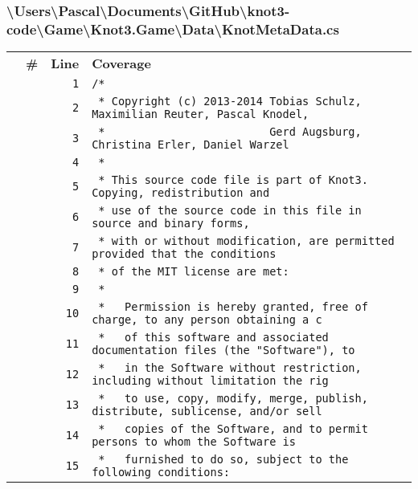 \documentclass[a4paper,10pt]{article}
\begin{document}
\subsubsection{\textbackslash Users\textbackslash Pascal\textbackslash Documents\textbackslash GitHub\textbackslash knot3-code\textbackslash Game\textbackslash Knot3.Game\textbackslash Data\textbackslash KnotMetaData.cs}
\begin{longtable}[l]{lrrl}
\textbf{} & \textbf{\#} & \textbf{Line} & \textbf{Coverage}\\
\cellcolor{gray} &  & \verb~1~ & \verb~/*~\\
\cellcolor{gray} &  & \verb~2~ & \verb~ * Copyright (c) 2013-2014 Tobias Schulz, Maximilian Reuter, Pascal Knodel,~\\
\cellcolor{gray} &  & \verb~3~ & \verb~ *                         Gerd Augsburg, Christina Erler, Daniel Warzel~\\
\cellcolor{gray} &  & \verb~4~ & \verb~ *~\\
\cellcolor{gray} &  & \verb~5~ & \verb~ * This source code file is part of Knot3. Copying, redistribution and~\\
\cellcolor{gray} &  & \verb~6~ & \verb~ * use of the source code in this file in source and binary forms,~\\
\cellcolor{gray} &  & \verb~7~ & \verb~ * with or without modification, are permitted provided that the conditions~\\
\cellcolor{gray} &  & \verb~8~ & \verb~ * of the MIT license are met:~\\
\cellcolor{gray} &  & \verb~9~ & \verb~ *~\\
\cellcolor{gray} &  & \verb~10~ & \verb~ *   Permission is hereby granted, free of charge, to any person obtaining a c~\\
\cellcolor{gray} &  & \verb~11~ & \verb~ *   of this software and associated documentation files (the "Software"), to ~\\
\cellcolor{gray} &  & \verb~12~ & \verb~ *   in the Software without restriction, including without limitation the rig~\\
\cellcolor{gray} &  & \verb~13~ & \verb~ *   to use, copy, modify, merge, publish, distribute, sublicense, and/or sell~\\
\cellcolor{gray} &  & \verb~14~ & \verb~ *   copies of the Software, and to permit persons to whom the Software is~\\
\cellcolor{gray} &  & \verb~15~ & \verb~ *   furnished to do so, subject to the following conditions:~\\

\end{longtable}
\end{document}
